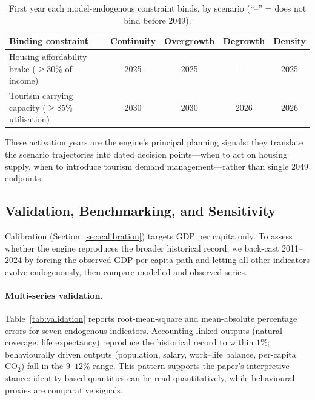 \documentclass[urbansci,article,submit,pdftex,moreauthors]{Definitions/mdpi}
\begin{document}
\begin{table}[H]
\caption{First year each model-endogenous constraint binds, by scenario (``--'' = does
not bind before 2049).}
\label{tab:constraints}
\begin{tabularx}{\textwidth}{Xcccc}
\toprule
\textbf{Binding constraint} & \textbf{Continuity} & \textbf{Overgrowth}
                            & \textbf{Degrowth} & \textbf{Density} \\
\midrule
Housing-affordability brake ($\geq$30\% of income) & 2025 & 2025 & -- & 2025 \\
Tourism carrying capacity ($\geq$85\% utilisation) & 2030 & 2030 & 2026 & 2026 \\
\bottomrule
\end{tabularx}
\end{table}

These activation years are the engine's principal planning signals: they translate the
scenario trajectories into dated decision points---when to act on housing supply, when
to introduce tourism demand management---rather than single 2049 endpoints.

\subsection{Validation, Benchmarking, and Sensitivity}
\label{subsec:validation}

Calibration (Section~\ref{sec:calibration}) targets GDP per capita only. To assess
whether the engine reproduces the broader historical record, we back-cast
2011--2024 by forcing the observed GDP-per-capita path and letting all other
indicators evolve endogenously, then compare modelled and observed series.

\paragraph{Multi-series validation.}
Table~\ref{tab:validation} reports root-mean-square and mean-absolute percentage
errors for seven endogenous indicators. Accounting-linked outputs (natural
coverage, life expectancy) reproduce the historical record to within $1\%$;
behaviourally driven outputs (population, salary, work--life balance, per-capita
CO$_2$) fall in the $9$--$12\%$ range. This pattern supports the paper's
interpretive stance: identity-based quantities can be read quantitatively, while
behavioural proxies are comparative signals.
\end{document}
